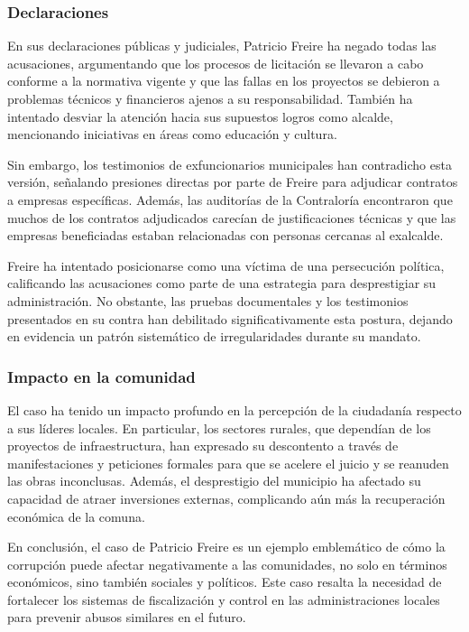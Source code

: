 \documentclass[letter,12pt]{article}
\begin{document}
	\subsubsection{Declaraciones}
	En sus declaraciones públicas y judiciales, Patricio Freire ha negado todas las acusaciones, argumentando que los procesos de licitación se llevaron a cabo conforme a la normativa vigente y que las fallas en los proyectos se debieron a problemas técnicos y financieros ajenos a su responsabilidad. También ha intentado desviar la atención hacia sus supuestos logros como alcalde, mencionando iniciativas en áreas como educación y cultura.
	
	Sin embargo, los testimonios de exfuncionarios municipales han contradicho esta versión, señalando presiones directas por parte de Freire para adjudicar contratos a empresas específicas. Además, las auditorías de la Contraloría encontraron que muchos de los contratos adjudicados carecían de justificaciones técnicas y que las empresas beneficiadas estaban relacionadas con personas cercanas al exalcalde.
	
	Freire ha intentado posicionarse como una víctima de una persecución política, calificando las acusaciones como parte de una estrategia para desprestigiar su administración. No obstante, las pruebas documentales y los testimonios presentados en su contra han debilitado significativamente esta postura, dejando en evidencia un patrón sistemático de irregularidades durante su mandato.
	
	\subsubsection{Impacto en la comunidad}
	El caso ha tenido un impacto profundo en la percepción de la ciudadanía respecto a sus líderes locales. En particular, los sectores rurales, que dependían de los proyectos de infraestructura, han expresado su descontento a través de manifestaciones y peticiones formales para que se acelere el juicio y se reanuden las obras inconclusas. Además, el desprestigio del municipio ha afectado su capacidad de atraer inversiones externas, complicando aún más la recuperación económica de la comuna.
	
	En conclusión, el caso de Patricio Freire es un ejemplo emblemático de cómo la corrupción puede afectar negativamente a las comunidades, no solo en términos económicos, sino también sociales y políticos. Este caso resalta la necesidad de fortalecer los sistemas de fiscalización y control en las administraciones locales para prevenir abusos similares en el futuro.
	
\end{document}

